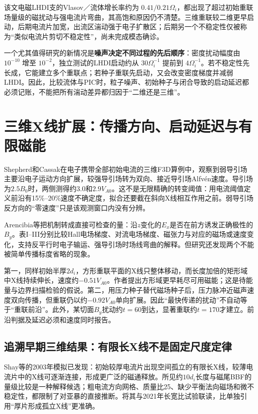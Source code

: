 该文电磁LHDI支的Vlasov／流体增长率约为 $0.41/0.21\Omega_i$，都出现了超过初始重联场量级的磁扰动与强电流片弯曲，其高饱和原因仍不清楚。三维重联较二维更早启动，后期电流片加宽，出流区湍动强于电子扩散区；后期另一个不稳定性仅被称为“类似电流片剪切不稳定性”，尚未完成模态确诊。

一个尤其值得研究的新情况是\textbf{噪声决定不同过程的先后顺序}：密度扰动幅度由 $10^{-10}$ 增至 $10^{-2}$，独立测试的LHDI启动约从 $30\Omega_i^{-1}$ 提前到 $4\Omega_i^{-1}$。若不稳定性先长成，它能建立多个重联点；若种子重联先启动，又会改变密度梯度并减弱LHDI。因此，比较流体与PIC时，粒子噪声、初始种子与闭合导致的启动延迟都必须记账，不能把所有湍动差异都归因于“二维还是三维”。

\section{三维X线扩展：传播方向、启动延迟与有限磁能}
Shepherd和Cassak在电子携带全部初始电流的三维F3D算例中，观察到弱导引场主要沿电子运动方向扩展，较强导引场转为双向、接近导引场Alfvén速度。导引场为$2.5B_0$时，两侧测得约$3.0$和$2.9V_{\!A0}$。这不是无限精确的转变阈值：用电流阈值定义前沿有15\%--20\%速度不确定度，拟合还要截在斜向X线相互作用之前。弱导引场反方向的“零速度”只是该观测窗口内没有分辨。\citep{Shepherd2012}

Arencibia等把机制转成直接可检查的量：沿$z$变化的$E_x$是否在前方诱发正确极性的$B_y$。表I--III分别比较Hall电场梯度、对流电场梯度、磁张力与对应的磁场或速度变化，支持反平行时电子输运、强导引场时场线弯曲的解释。但研究还发现两个不能被简单传播标度省略的现象。\citep{L275}

第一，同样初始半厚$2d_i$，方形重联平面的X线只整体移动，而长度加倍的矩形域中X线持续伸长，速度约$-0.51V_{\!A0}$。作者提出方形域更早耗尽可用磁能；这是待能量与边界扫描检验的假说。第二，用压力种子替代磁场种子后，压力脉冲近磁声速度双向传播，但重联仍以约$-0.92V_{\!A0}$单向扩展。因此“最快传递的扰动”不自动等于“重联前沿”。此外，某切面$B_y$扰动约$t=60$到达，显著重联约$t=170$才建立。前沿判据及延迟必须和速度同时报告。

\subsection{追溯早期三维结果：有限长X线不是固定尺度定律}
Shay等的2003年模拟已发现：初始较厚电流片出现空间孤立的有限长X线，较薄电流片中的X线可逐渐连接，形成更广泛的磁通释放。所见约$10d_i$长度与磁尾BBF的量级比较是一种解释候选；粗电流方向网格、质量比25、缺少平衡法向磁场和微不稳定性，都限制了对亚暴的直接推断。将其与2021年长宽比试验联读，比单独引用“厚片形成孤立X线”更准确。\citep{Shay2003,L275}

